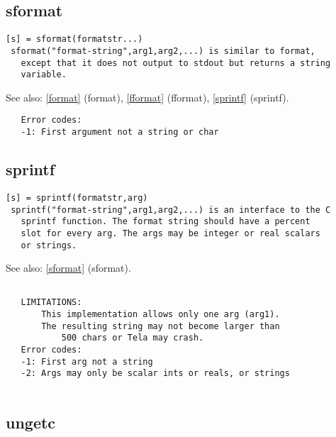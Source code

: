\documentclass[a4paper]{article}
\begin{document}
\subsection{sformat\label{sformat}}

\begin{tscreen}
\begin{verbatim}
[s] = sformat(formatstr...)
 sformat("format-string",arg1,arg2,...) is similar to format,
   except that it does not output to stdout but returns a string
   variable.
\end{verbatim}

See also: \ref{format} {(format)}, \ref{fformat} {(fformat)}, \ref{sprintf} {(sprintf)}.
\begin{verbatim}
   Error codes:
   -1: First argument not a string or char 
\end{verbatim}
\end{tscreen}



\subsection{sprintf\label{sprintf}}

\begin{tscreen}
\begin{verbatim}
[s] = sprintf(formatstr,arg)
 sprintf("format-string",arg1,arg2,...) is an interface to the C
   sprintf function. The format string should have a percent
   slot for every arg. The args may be integer or real scalars
   or strings.
\end{verbatim}

See also: \ref{sformat} {(sformat)}.
\begin{verbatim}

   LIMITATIONS:
       This implementation allows only one arg (arg1).
       The resulting string may not become larger than
           500 chars or Tela may crash.
   Error codes:
   -1: First arg not a string
   -2: Args may only be scalar ints or reals, or strings
   
\end{verbatim}
\end{tscreen}



\subsection{ungetc\label{ungetc}}
\end{document}
